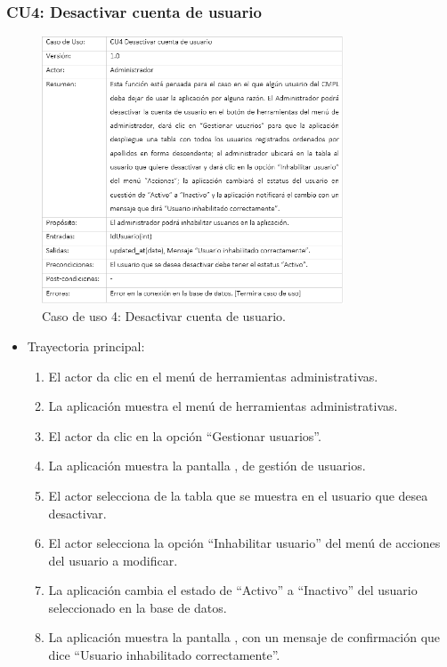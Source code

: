 		\subsubsection{CU4: Desactivar cuenta de usuario}
			\begin{figure}[htbp!]
				\centering
					\includegraphics[width=0.8\textwidth]{images/CU/CU4}
					\caption{Caso de uso 4: Desactivar cuenta de usuario.}
				\label{Tabla}
			\end{figure}
			
			\begin{itemize}
				\item Trayectoria principal:
					\begin{enumerate}
						\item El actor da clic en el menú de herramientas administrativas.
						\item La aplicación muestra el menú de herramientas administrativas.
						\item El actor da clic en la opción ``Gestionar usuarios''.
						\item La aplicación muestra la pantalla , de gestión de usuarios.
						\item El actor selecciona de la tabla que se muestra en  el usuario que desea desactivar.
						\item El actor selecciona la opción ``Inhabilitar usuario'' del menú de acciones del usuario a modificar.
						\item La aplicación cambia el estado de ``Activo'' a ``Inactivo'' del usuario seleccionado en la base de datos.
						\item La aplicación muestra la pantalla , con un mensaje de confirmación que dice ``Usuario inhabilitado correctamente''.
					\end{enumerate}
			\end{itemize}
			
